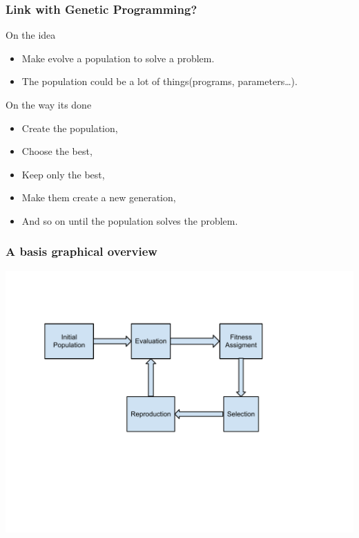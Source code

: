 \begin{frame}
  \frametitle{Link with Genetic Programming?}
  \begin{block}{On the idea}
    \begin{itemize}
    \item Make evolve a population to solve a problem.
    \item The population could be a lot of things(programs, parameters\dots).
    \end{itemize}
  \end{block}

  \begin{block}{On the way its done}
    \begin{itemize}
    \item Create the population,
    \item Choose the best,
    \item Keep only the best,
    \item Make them create a new generation,
    \item And so on until the population solves the problem.
    \end{itemize}
  \end{block}
\end{frame}

\begin{frame}
  \frametitle{A basis graphical overview}
  \begin{center}
    \includegraphics[scale=0.5]{img/cycle}
  \end{center}
\end{frame}

